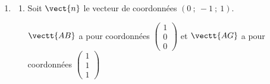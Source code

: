 \begin{enumerate}
\begin{enumerate}
$\begin{aligned}[t]
\left\{
\begin{array}{l !{=} l }
k & \dfrac{1}{2}+\dfrac{1}{2} t \\[5pt]
\dfrac{1}{2}k & t \\[5pt]
\dfrac{1}{2}k & t
\end{array}
\right.
&
\iff
\left\{
\begin{array}{l !{=} l }
k & \dfrac{1}{2}+\dfrac{1}{2} t \\[5pt]
k & 2 t
\end{array} 
\right.
\iff
\left\{
\begin{array}{l !{=} l }
2t & \dfrac{1}{2}+\dfrac{1}{2} t \\[5pt]
k & 2 t
\end{array} 
\right.
\iff
\left\{
\begin{array}{l !{=} l }
\dfrac{3}{2} t & \dfrac{1}{2} \\[5pt]
k & 2 t
\end{array}
\right.\\
&
\iff
\left\{
\begin{array}{l !{=} l }
 t & \dfrac{1}{3} \\[5pt]
k & \dfrac{2}{3}
\end{array}
\right.
\end{aligned}$

Donc les droites (AJ) et (IG) sont sécantes.
Pour $k=\dfrac{2}{3}$, on a
$\left \{
\begin{array}{l !{=} l }
k & \dfrac{2}{3} \\[5pt]
\dfrac{1}{2}k &  \dfrac{1}{3} \\[5pt]
\dfrac{1}{2}k &  \dfrac{1}{3}
\end{array} 
\right.$

Le point S d'intersection des droites (AJ) et (IG) a donc pour coordonnées
$\left (\dfrac{2}{3}\;,\; \dfrac{1}{3} \;,\; \dfrac{1}{3}\right )$.
		\end{enumerate}

		\item \begin{enumerate}
			\item 
Soit $\vect{n}$ le vecteur de coordonnées $(0 ~;~-1 ~;~ 1)$.

$\vectt{AB}$ a pour coordonnées 
$\begin{pmatrix}
1\\ 0 \\ 0
\end{pmatrix}$
et $\vectt{AG}$ a pour coordonnées
$\begin{pmatrix}
1\\ 1\\1
\end{pmatrix}$


\end{enumerate}
\end{enumerate}
